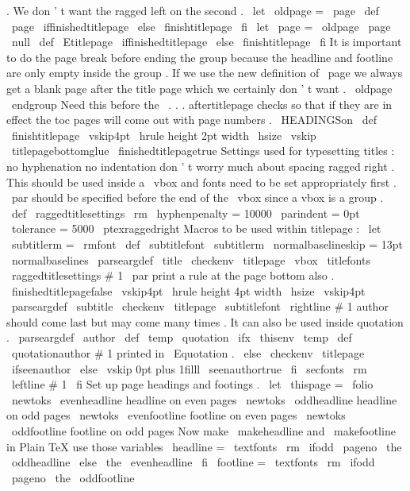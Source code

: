 {{{{{.
We
don
'
t
want
the
ragged
left
on
the
second
.
\
let
\
oldpage
=
\
page
\
def
\
page
{
%
\
iffinishedtitlepage
\
else
\
finishtitlepage
\
fi
\
let
\
page
=
\
oldpage
\
page
\
null
}
%
}
\
def
\
Etitlepage
{
%
\
iffinishedtitlepage
\
else
\
finishtitlepage
\
fi
%
It
is
important
to
do
the
page
break
before
ending
the
group
%
because
the
headline
and
footline
are
only
empty
inside
the
group
.
%
If
we
use
the
new
definition
of
\
page
we
always
get
a
blank
page
%
after
the
title
page
which
we
certainly
don
'
t
want
.
\
oldpage
\
endgroup
%
%
Need
this
before
the
\
.
.
.
aftertitlepage
checks
so
that
if
they
are
%
in
effect
the
toc
pages
will
come
out
with
page
numbers
.
\
HEADINGSon
}
\
def
\
finishtitlepage
{
%
\
vskip4pt
\
hrule
height
2pt
width
\
hsize
\
vskip
\
titlepagebottomglue
\
finishedtitlepagetrue
}
%
Settings
used
for
typesetting
titles
:
no
hyphenation
no
indentation
%
don
'
t
worry
much
about
spacing
ragged
right
.
This
should
be
used
%
inside
a
\
vbox
and
fonts
need
to
be
set
appropriately
first
.
\
par
should
%
be
specified
before
the
end
of
the
\
vbox
since
a
vbox
is
a
group
.
%
\
def
\
raggedtitlesettings
{
%
\
rm
\
hyphenpenalty
=
10000
\
parindent
=
0pt
\
tolerance
=
5000
\
ptexraggedright
}
%
Macros
to
be
used
within
titlepage
:
\
let
\
subtitlerm
=
\
rmfont
\
def
\
subtitlefont
{
\
subtitlerm
\
normalbaselineskip
=
13pt
\
normalbaselines
}
\
parseargdef
\
title
{
%
\
checkenv
\
titlepage
\
vbox
{
\
titlefonts
\
raggedtitlesettings
#
1
\
par
}
%
%
print
a
rule
at
the
page
bottom
also
.
\
finishedtitlepagefalse
\
vskip4pt
\
hrule
height
4pt
width
\
hsize
\
vskip4pt
}
\
parseargdef
\
subtitle
{
%
\
checkenv
\
titlepage
{
\
subtitlefont
\
rightline
{
#
1
}
}
%
}
%
author
should
come
last
but
may
come
many
times
.
%
It
can
also
be
used
inside
quotation
.
%
\
parseargdef
\
author
{
%
\
def
\
temp
{
\
quotation
}
%
\
ifx
\
thisenv
\
temp
\
def
\
quotationauthor
{
#
1
}
%
printed
in
\
Equotation
.
\
else
\
checkenv
\
titlepage
\
ifseenauthor
\
else
\
vskip
0pt
plus
1filll
\
seenauthortrue
\
fi
{
\
secfonts
\
rm
\
leftline
{
#
1
}
}
%
\
fi
}
%
Set
up
page
headings
and
footings
.
\
let
\
thispage
=
\
folio
\
newtoks
\
evenheadline
%
headline
on
even
pages
\
newtoks
\
oddheadline
%
headline
on
odd
pages
\
newtoks
\
evenfootline
%
footline
on
even
pages
\
newtoks
\
oddfootline
%
footline
on
odd
pages
%
Now
make
\
makeheadline
and
\
makefootline
in
Plain
TeX
use
those
variables
\
headline
=
{
{
\
textfonts
\
rm
\
ifodd
\
pageno
\
the
\
oddheadline
\
else
\
the
\
evenheadline
\
fi
}
}
\
footline
=
{
{
\
textfonts
\
rm
\
ifodd
\
pageno
\
the
\
oddfootline
}}}}}}
